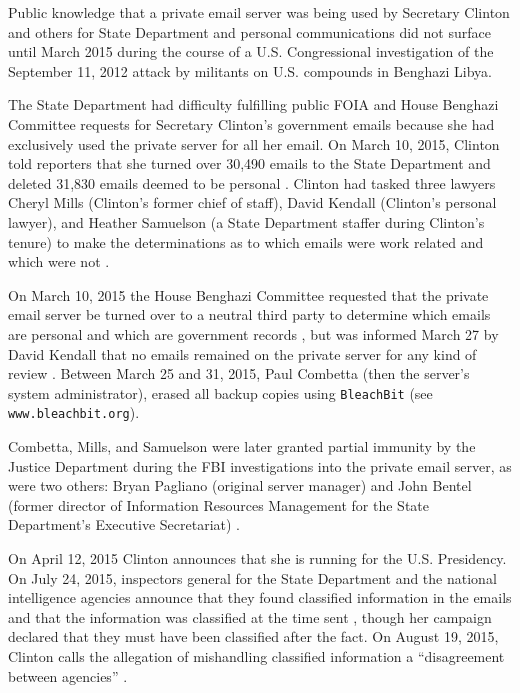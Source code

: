 \documentclass[journal]{vgtc}                %
\begin{document}
Public knowledge that a private email server was being used by Secretary Clinton and others for State Department and personal communications did not surface until March 2015 \cite{NewYorkTimes2015} during the course of a U.S. Congressional investigation \cite{BenghaziReport} of the September 11, 2012 attack by militants on U.S. compounds in Benghazi Libya.  

The State Department had difficulty fulfilling public FOIA and House Benghazi Committee requests \cite{TakingRootWashPost} for Secretary Clinton's government emails because she had exclusively used the private server for all her email.  On March 10, 2015,  Clinton told reporters that she turned over 30,490 emails to the State Department and deleted 31,830 emails deemed to be personal \cite{WashPostTimeline}.    Clinton had tasked three lawyers Cheryl Mills (Clinton's former chief of staff),  David Kendall (Clinton's personal lawyer), and Heather Samuelson (a State Department staffer during Clinton's tenure) to make the determinations as to which emails were work related and which were not \cite{emailVetting, thompsonTimeline}.   

On March 10, 2015 the House Benghazi Committee requested that the private email server be turned over to a neutral third party to determine which emails are personal and which are government records \cite{serverRequest}, but was informed March 27 by David Kendall that no emails remained on the private server for any kind of review \cite{serverScrubbedLawyer}.
Between March 25 and 31, 2015, Paul Combetta (then the server's system administrator), erased all backup copies using \texttt{BleachBit} (see \texttt{www.bleachbit.org}).    

Combetta, Mills, and Samuelson were later granted partial immunity by the Justice Department during the FBI investigations into the private email server, as were two others: Bryan Pagliano (original server manager) and  John Bentel (former director of Information Resources Management for the State Department's Executive Secretariat) \cite{immunityPolitico, immunityDailyCaller, immunityIT}.  

On April 12, 2015 Clinton announces that she is running for the U.S. Presidency.  On July 24, 2015, inspectors general for the State Department  and the national intelligence agencies announce that they found classified information in the emails and that the information was classified at the time sent \cite{serverClassified}, though her campaign declared that they must have been classified after the fact. On August 19, 2015, Clinton calls the allegation of mishandling classified information a ``disagreement between agencies'' \cite{clintonDenialGuardian}.
\end{document}
